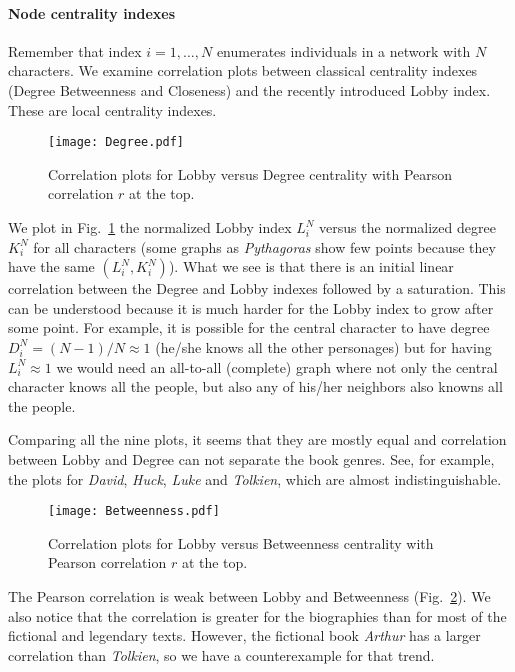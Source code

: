 \documentclass[review]{elsarticle}
\begin{document}
\paragraph{Node centrality indexes} 
Remember that index $i = 1, \ldots , N$ enumerates individuals in a
network with $N$ characters.
We examine correlation plots between classical centrality indexes
(Degree Betweenness and Closeness)
and the recently introduced Lobby index. 
These are local centrality indexes.

\begin{figure}[ht]
\centering
\texttt{[image: Degree.pdf]}
\caption{\label{FigD} Correlation plots for Lobby versus Degree centrality 
with Pearson correlation $r$ at the top.}
\end{figure}

We plot in Fig.~\ref{FigD} the normalized 
Lobby index $L^N_i$ versus the normalized 
degree $K^N_i$ for all characters (some graphs as \emph{Pythagoras}
show few points because they have the same $(L^N_i,K^N_i)$).
What we see is that there is an initial linear
correlation between the Degree and Lobby indexes followed by
a saturation. This can be understood because it is much harder
for the Lobby index to grow after some point. For example,
it is possible for the central character 
to have degree $D^N_i=(N-1)/N \approx 1$
(he/she knows all the other personages) but for having
$L_i^N \approx 1$ we would need an all-to-all (complete) graph
where not only the central character knows all the people,
but also any of his/her neighbors also knowns all the people.

Comparing all the nine plots, it seems that they are mostly
equal and correlation between Lobby and Degree can not separate
the book genres. See, for example, the plots for
\emph{David}, \emph{Huck}, \emph{Luke} 
and \emph{Tolkien}, which are almost indistinguishable.

\begin{figure}[ht]
\centering
\texttt{[image: Betweenness.pdf]}
\caption{\label{FigB} Correlation plots for Lobby 
versus Betweenness centrality 
with Pearson correlation $r$ at the top.}
\end{figure}

The Pearson correlation is weak between
Lobby and Betweenness (Fig.~\ref{FigB}). We also notice that
the correlation is greater for the biographies than for
most of the fictional and legendary texts. 
However, the fictional book \emph{Arthur} has a 
larger correlation than \emph{Tolkien}, 
so we have a counterexample for that trend.
\end{document}
